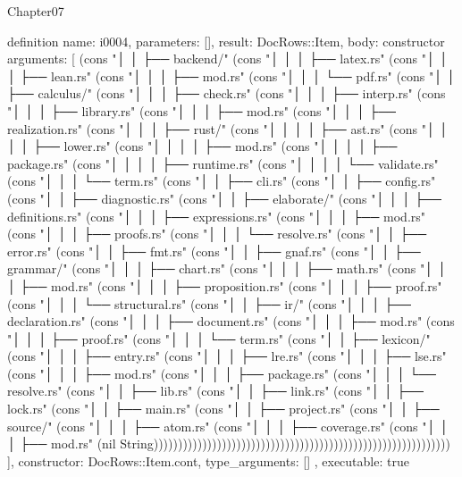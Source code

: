 \begin{lexlean}{Chapter07}
\begin{semanticmodule}
definition{
  name: i0004,
  parameters: [],
  result: DocRows::Item,
  body: constructor{
    arguments: [
      (cons "│   │       ├── backend/" (cons "│   │       │   ├── latex.rs" (cons "│   │       │   ├── lean.rs" (cons "│   │       │   ├── mod.rs" (cons "│   │       │   └── pdf.rs" (cons "│   │       ├── calculus/" (cons "│   │       │   ├── check.rs" (cons "│   │       │   ├── interp.rs" (cons "│   │       │   ├── library.rs" (cons "│   │       │   ├── mod.rs" (cons "│   │       │   ├── realization.rs" (cons "│   │       │   ├── rust/" (cons "│   │       │   │   ├── ast.rs" (cons "│   │       │   │   ├── lower.rs" (cons "│   │       │   │   ├── mod.rs" (cons "│   │       │   │   ├── package.rs" (cons "│   │       │   │   ├── runtime.rs" (cons "│   │       │   │   └── validate.rs" (cons "│   │       │   └── term.rs" (cons "│   │       ├── cli.rs" (cons "│   │       ├── config.rs" (cons "│   │       ├── diagnostic.rs" (cons "│   │       ├── elaborate/" (cons "│   │       │   ├── definitions.rs" (cons "│   │       │   ├── expressions.rs" (cons "│   │       │   ├── mod.rs" (cons "│   │       │   ├── proofs.rs" (cons "│   │       │   └── resolve.rs" (cons "│   │       ├── error.rs" (cons "│   │       ├── fmt.rs" (cons "│   │       ├── gnaf.rs" (cons "│   │       ├── grammar/" (cons "│   │       │   ├── chart.rs" (cons "│   │       │   ├── math.rs" (cons "│   │       │   ├── mod.rs" (cons "│   │       │   ├── proposition.rs" (cons "│   │       │   ├── proof.rs" (cons "│   │       │   └── structural.rs" (cons "│   │       ├── ir/" (cons "│   │       │   ├── declaration.rs" (cons "│   │       │   ├── document.rs" (cons "│   │       │   ├── mod.rs" (cons "│   │       │   ├── proof.rs" (cons "│   │       │   └── term.rs" (cons "│   │       ├── lexicon/" (cons "│   │       │   ├── entry.rs" (cons "│   │       │   ├── lre.rs" (cons "│   │       │   ├── lse.rs" (cons "│   │       │   ├── mod.rs" (cons "│   │       │   ├── package.rs" (cons "│   │       │   └── resolve.rs" (cons "│   │       ├── lib.rs" (cons "│   │       ├── link.rs" (cons "│   │       ├── lock.rs" (cons "│   │       ├── main.rs" (cons "│   │       ├── project.rs" (cons "│   │       ├── source/" (cons "│   │       │   ├── atom.rs" (cons "│   │       │   ├── coverage.rs" (cons "│   │       │   ├── mod.rs" (nil String)))))))))))))))))))))))))))))))))))))))))))))))))))))))))))))
    ],
    constructor: DocRows::Item.cont,
    type_arguments: []
  },
  executable: true
}


\end{semanticmodule}
\end{lexlean}
